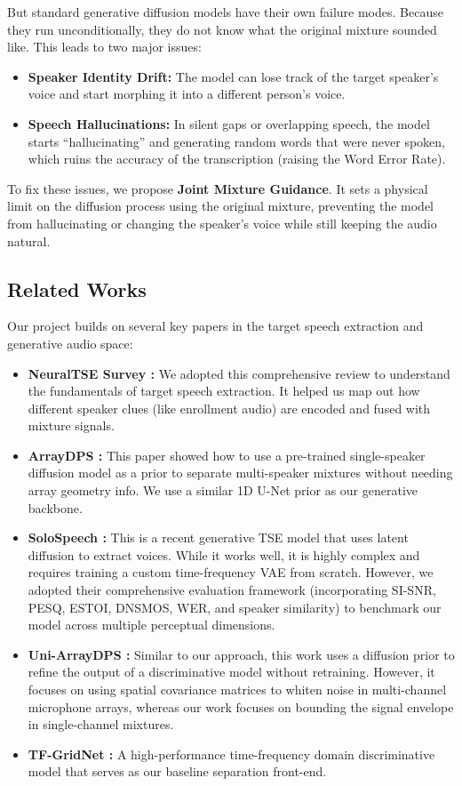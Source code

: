 \documentclass[conference]{IEEEtran}
\begin{document}
But standard generative diffusion models have their own failure modes. Because they run unconditionally, they do not know what the original mixture sounded like. This leads to two major issues:
\begin{itemize}
    \item \textbf{Speaker Identity Drift:} The model can lose track of the target speaker's voice and start morphing it into a different person's voice.
    \item \textbf{Speech Hallucinations:} In silent gaps or overlapping speech, the model starts ``hallucinating'' and generating random words that were never spoken, which ruins the accuracy of the transcription (raising the Word Error Rate).
\end{itemize}
To fix these issues, we propose \textbf{Joint Mixture Guidance}. It sets a physical limit on the diffusion process using the original mixture, preventing the model from hallucinating or changing the speaker's voice while still keeping the audio natural.





\subsection{Related Works}
Our project builds on several key papers in the target speech extraction and generative audio space:
\begin{itemize}
    \item \textbf{NeuralTSE Survey \cite{b1}:} We adopted this comprehensive review to understand the fundamentals of target speech extraction. It helped us map out how different speaker clues (like enrollment audio) are encoded and fused with mixture signals.
    \item \textbf{ArrayDPS \cite{b2}:} This paper showed how to use a pre-trained single-speaker diffusion model as a prior to separate multi-speaker mixtures without needing array geometry info. We use a similar 1D U-Net prior as our generative backbone.
    \item \textbf{SoloSpeech \cite{b4}:} This is a recent generative TSE model that uses latent diffusion to extract voices. While it works well, it is highly complex and requires training a custom time-frequency VAE from scratch. However, we adopted their comprehensive evaluation framework (incorporating SI-SNR, PESQ, ESTOI, DNSMOS, WER, and speaker similarity) to benchmark our model across multiple perceptual dimensions.
    \item \textbf{Uni-ArrayDPS \cite{b3}:} Similar to our approach, this work uses a diffusion prior to refine the output of a discriminative model without retraining. However, it focuses on using spatial covariance matrices to whiten noise in multi-channel microphone arrays, whereas our work focuses on bounding the signal envelope in single-channel mixtures.
    \item \textbf{TF-GridNet \cite{b5}:} A high-performance time-frequency domain discriminative model that serves as our baseline separation front-end.
\end{itemize}
\end{document}
